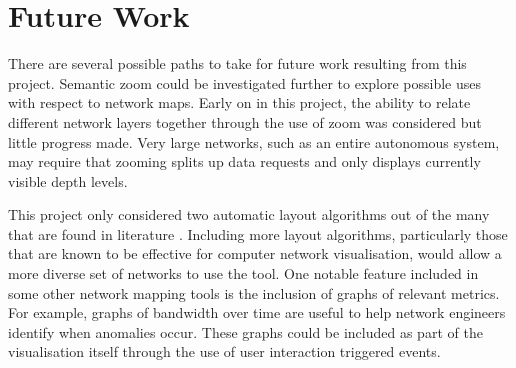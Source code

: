 \documentclass[11pt, a4paper]{article}
\begin{document}
\newpage

\section{Future Work}
\label{sec:future-work}

There are several possible paths to take for future work resulting from this
project. Semantic zoom could be investigated further to explore possible uses
with respect to network maps. Early on in this project, the ability to relate
different network layers together through the use of zoom was considered but
little progress made. Very large networks, such as an entire autonomous system,
may require that zooming splits up data requests and only displays currently
visible depth levels. 

This project only considered two automatic layout algorithms out of the many
that are found in literature \cite{Battista_1994}. Including more layout
algorithms, particularly those that are known to be effective for computer
network visualisation, would allow a more diverse set of networks to use the
tool. One notable feature included in some other network mapping tools is the
inclusion of graphs of relevant metrics. For example, graphs of bandwidth over
time are useful to help network engineers identify when anomalies occur.  These
graphs could be included as part of the visualisation itself through the use of
user interaction triggered events.
\end{document}
